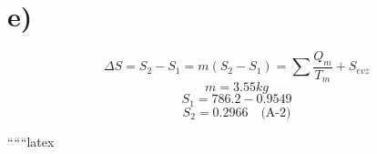 

\section*{e)}
\[
\Delta S = S_2 - S_1 = m (S_2 - S_1) = \sum \frac{Q_m}{T_m} + S_{evz}
\]
\[
m = 3.55 kg
\]
\[
S_1 = 786.2 - 0.9549
\]
\[
S_2 = 0.2966 \quad \text{(A-2)}
\]

``````latex